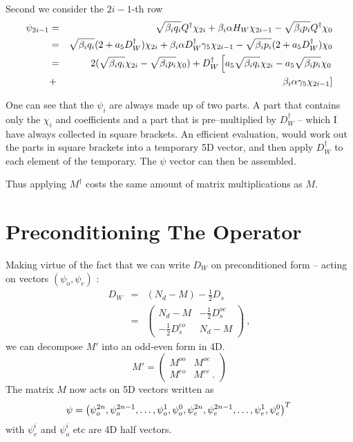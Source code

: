 \documentclass[12pt]{article}
\begin{document}
\begin{itemize}
\begin{eqnarray}
\end{eqnarray}
Second we consider the $2i-1$-th row
\begin{eqnarray}
\psi_{2i-1} &=& \sqrt{ \beta_{i} q_i } Q^{\dagger} \chi_{2i} + \beta_i \alpha H_W \chi_{2i-1} - \sqrt{\beta_i p_i} Q^{\dagger}  \chi_{0} \\
 &=&  \sqrt{ \beta_{i} q_i } (2 + a_5 D_W^{\dagger} ) \chi_{2i} +  \beta_i \alpha  D_W^{\dagger} \gamma_5 \chi_{2i-1}  - \sqrt{\beta_i p_i} (2 + a_5 D_W^{\dagger}) \chi_{0} \\
 &=& 2 ( \sqrt{ \beta_{i} q_i } \chi_{2i} - \sqrt{\beta_i p_i} \chi_0 ) +  D_W^{\dagger}  \left[  a_5 \sqrt{ \beta_{i} q_i } \chi_{2i} -  a_5 \sqrt{\beta_i p_i} \chi_0 \nonumber \right. \\   &+&  \left. \beta_i \alpha \gamma_5  \chi_{2i-1} \right]
\end{eqnarray}
\end{itemize}
One can see that the $\psi_i$ are always made up of two parts. A part that
contains only the $\chi_i$ and coefficients and a part that is pre--multiplied
by $D^{\dagger}_W$ -- which I have always collected in square brackets. An 
efficient evaluation, would work out the parts in square brackets into
a temporary 5D vector, and then apply $D_W^{\dagger}$ to each element 
of the temporary. The $\psi$ vector can then be assembled. 

Thus applying $M^{\dagger}$ costs the same amount of matrix multiplications
as $M$.

\section{Preconditioning The Operator}
Making virtue of the fact that we can write $D_W$ on preconditioned
form -- acting on vectors $(\psi_o, \psi_e )$ :
\begin{eqnarray}
D_W &=& (N_d - M) - \frac{1}{2} D_s \\
    &=& \left( \begin{array}{cc} 
      N_d - M & -\frac{1}{2} D_s^{oe} \\
      -\frac{1}{2} D_s^{eo} & N_d - M 
    \end{array}\right) \ ,
\end{eqnarray}
we can decompose $M'$ into an odd-even form in 4D.
\begin{equation}
M' = \left( \begin{array}{cc} 
      M^{oo} & M^{oe} \\
      M^{eo} & M^{ee} \ .
\end{array} \right)
\end{equation}
The matrix $M$ now acts on 5D vectors written 
as 
\begin{equation}
\psi = \left( \psi_{o}^{2n}, \psi_{o}^{2n-1}, \ldots, \psi_{o}^{1}, \psi_{o}^0, \psi_{e}^{2n}, \psi_{e}^{2n-1}, \ldots, \psi_{e}^{1}, \psi_{e}^0 \right)^{T} \\
\end{equation}
with $\psi_{e}^{i}$ and $\psi_{o}^{i}$ etc are 4D half vectors.
\end{document}
